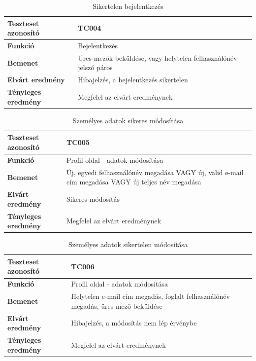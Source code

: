 \begin{table}[h!]
	\centering
	\begin{tabular}{|l|p{10cm}|}
		\hline
		\textbf{Teszteset azonosító} & TC004 \\ \hline
		\textbf{Funkció} & Bejelentkezés \\ \hline
		\textbf{Bemenet} & Üres mezők beküldése, vagy helytelen felhasználónév-jelszó páros \\ \hline
		\textbf{Elvárt eredmény} & Hibajelzés, a bejelentkezés sikertelen\\ \hline
		\textbf{Tényleges eredmény} & Megfelel az elvárt eredménynek \\ \hline
	\end{tabular}
	\caption{Sikertelen bejelentkezés}
	\label{tab:bejelentkezes_ures}
\end{table}

\begin{table}[h!]
	\centering
	\begin{tabular}{|l|p{10cm}|}
		\hline
		\textbf{Teszteset azonosító} & TC005 \\ \hline
		\textbf{Funkció} & Profil oldal - adatok módosítása \\ \hline
		\textbf{Bemenet} & Új, egyedi felhasználónév megadása VAGY új, valid e-mail cím megadása VAGY új teljes név megadása \\ \hline
		\textbf{Elvárt eredmény} & Sikeres módosítás \\ \hline
		\textbf{Tényleges eredmény} & Megfelel az elvárt eredménynek \\ \hline
	\end{tabular}
	\caption{Személyes adatok sikeres módosítása}
	\label{tab:profil_felhasznalonev_modositas}
\end{table}

\begin{table}[h!]
	\centering
	\begin{tabular}{|l|p{10cm}|}
		\hline
		\textbf{Teszteset azonosító} & TC006 \\ \hline
		\textbf{Funkció} & Profil oldal - adatok módosítása \\ \hline
		\textbf{Bemenet} & Helytelen e-mail cím megadás, foglalt felhasználónév megadás, üres mező beküldése \\ \hline
		\textbf{Elvárt eredmény} & Hibajelzés, a módosítás nem lép érvénybe \\ \hline
		\textbf{Tényleges eredmény} & Megfelel az elvárt eredménynek \\ \hline
	\end{tabular}
	\caption{Személyes adatok sikertelen módosítása}
	\label{tab:profil_felhasznalonev_foglalt}
\end{table}


